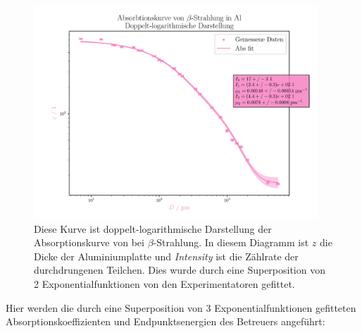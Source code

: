 \documentclass[12pt,english,ngerman]{scrartcl}
\begin{document}
\begin{figure}[H]
	\begin{center}
		\includegraphics[width=0.95\textwidth]{figures/absorption2log2er.pdf}
	\end{center}
	\caption[Doppelt-logarithmische Darstellung der Absorptionskurve von  bei
		$\beta$-Strahlung (2er Superposition Experimentatoren)]{
		Diese Kurve ist
		doppelt-logarithmische Darstellung der Absorptionskurve von  bei
		$\beta$-Strahlung. In diesem Diagramm ist $z$ die Dicke der Aluminiumplatte und
		\emph{Intensity} ist die Zählrate der durchdrungenen Teilchen. Dies wurde durch
		eine Superposition von 2 Exponentialfunktionen von den Experimentatoren
		gefittet.
	}\label{fig:2er_alu_abs_doppel}
\end{figure}

Hier werden die durch eine Superposition von 3 Exponentialfunktionen gefitteten
Absorptionskoeffizienten und Endpunktsenergien des Betreuers angeführt:
\end{document}

